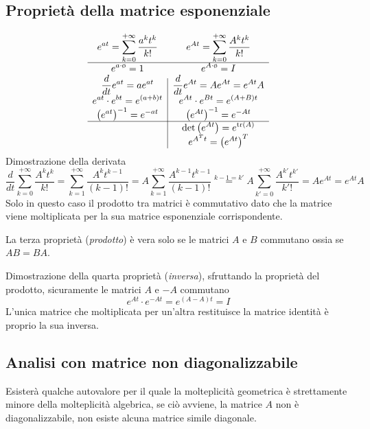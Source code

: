 \subsection{Proprietà della matrice esponenziale}
$$
\begin{array}{>{\displaystyle}c|>{\displaystyle}c}
 e^{at}=\sum_{k=0}^{+\infty} \frac{a^kt^k}{k!} & e^{At}=\sum_{k=0}^{+\infty}
\frac{A^k t^k}{k!} \\ \hline
e^{a\cdot \text{\o{}} } = 1 & e^{A\cdot \text{\o{}}} = I\\
\frac{d}{dt} e^{at} = ae^{at} & \frac{d}{dt} e^{At} = Ae^{At} = e^{At}A\\
e^{at}\cdot e^{bt} = e^{(a+b)t} & e^{At}\cdot e^{Bt} = e^{(A+B)t}\\
\left(e^{at}\right)^{-1} = e^{-at} & \left(e^{At}\right)^{-1} = e^{-At}\\
 \hline & \text{det}\left(e^{At}\right) =
e^{\text{tr}(A)}\\
 & e^{A^Tt} = \left(e^{At}\right)^T
\end{array}
$$
Dimostrazione della derivata
$$
\frac{d}{dt} \sum_{k=0}^{+\infty} \frac{A^kt^k}{k!} =
\sum_{k=1}^{+\infty}\frac{A^kt^{k-1}}{(k-1)!} =
A\sum_{k=1}^{+\infty} \frac{A^{k-1}t^{k-1}}{(k-1)!} \stackrel{k-1=k'}{=}
A\sum_{k'=0}^{+\infty}\frac{A^{k'}t^{k'}}{k'!} = Ae^{At} = e^{At}A
$$
Solo in questo caso il prodotto tra matrici è commutativo dato che la matrice
viene moltiplicata per la sua matrice esponenziale corrispondente.

La terza proprietà (\textit{prodotto}) è vera solo se le matrici $A$ e $B$
commutano ossia \linebreak se $AB = BA$.

Dimostrazione della quarta proprietà (\textit{inversa}), sfruttando la
proprietà del prodotto, sicuramente le matrici $A$ e $-A$ commutano
$$
e^{At} \cdot e^{-At} = e^{(A-A)t} = I
$$
L'unica matrice che moltiplicata per un'altra restituisce la matrice identità è
proprio la sua inversa.

\newpage
\subsection{Analisi con matrice non diagonalizzabile}
Esisterà qualche autovalore per il quale la molteplicità geometrica è
strettamente minore della molteplicità algebrica, se ciò avviene, la matrice
$A$ non è diagonalizzabile, non esiste alcuna matrice simile diagonale.

